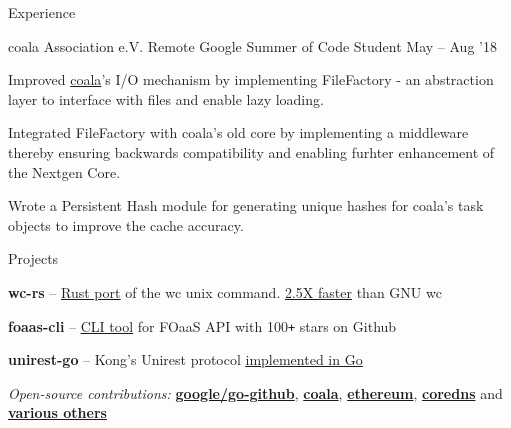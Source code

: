 \documentclass{resume} %
\begin{document}
\begin{rSection}{Experience}
  \begin{rWorkSection}{coala Association e.V.}
                     {Remote}
                     {Google Summer of Code Student}
                     {May -- Aug '18}
  {
    \item Improved \href{http://coala.io/}{coala}'s I/O mechanism by implementing FileFactory - an abstraction layer to interface with files and enable lazy loading.
    \item Integrated FileFactory with coala's old core by implementing a middleware thereby ensuring backwards compatibility and enabling furhter enhancement of the Nextgen Core.
    \item Wrote a Persistent Hash module for generating unique hashes for coala's task objects to improve the cache accuracy.
  }
  \end{rWorkSection}
\end{rSection}



\begin{rSection}{Projects}
  \begin{rProjectSection}
    \item \textbf {wc-rs} -- \href{https://github.com/palash25/wc-rs}{\underline{Rust port}} of the wc unix command. \underline{2.5X faster} than GNU wc
    \item \textbf {foaas-cli} -- \href{https://github.com/palash25/foaas-cli}{\underline{CLI tool}} for FOaaS API with 100\texttt{+} stars on Github
    \item \textbf {unirest-go} -- Kong's Unirest protocol \href{https://github.com/palash25/unirest-go}{\underline{implemented in Go}}
  \end{rProjectSection}

  \begin{rBlurbSection}
    \item {\em Open-source contributions:}
      \href{http://bit.ly/2LfMLIW}{\textbf{google/go-github}},
      \href{http://bit.ly/2Quw26G}{\textbf{coala}},
      \href{http://bit.ly/2NLmHsD}{\textbf{ethereum}},
      \href{https://github.com/coredns/coredns/pull/3011}{\textbf{coredns}} and
      \href{http://bit.ly/2lJ4PCy}{\textbf{various others}}
  \end{rBlurbSection}
\end{rSection}
\end{document}
